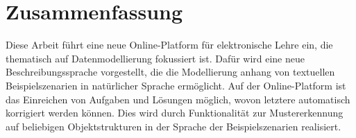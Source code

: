 \chapter*{Zusammenfassung}


Diese Arbeit führt eine neue Online-Platform für elektronische Lehre ein, die thematisch auf Datenmodellierung fokussiert ist.
Dafür wird eine neue Beschreibungssprache vorgestellt, die die Modellierung anhang von textuellen Beispielszenarien in natürlicher Sprache ermöglicht.
Auf der Online-Platform ist das Einreichen von Aufgaben und Lösungen möglich, wovon letztere automatisch korrigiert werden können.
Dies wird durch Funktionalität zur Mustererkennung auf beliebigen Objektstrukturen in der Sprache der Beispielszenarien realisiert.
